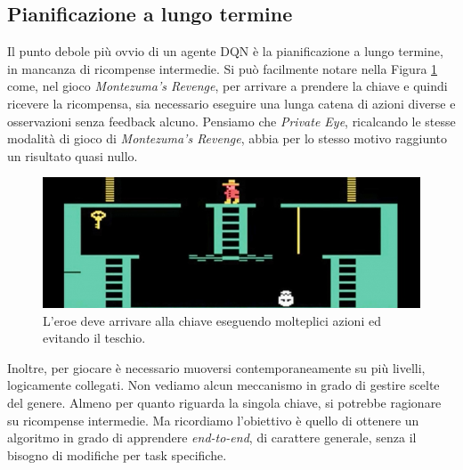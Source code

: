 \documentclass[twoside,twocolumn,10pt]{extarticle}
\theoremstyle{definition}
\begin{document}
	\subsection{Pianificazione a lungo termine}
		Il punto debole più ovvio di un agente DQN è la pianificazione a lungo termine, in mancanza di ricompense intermedie. Si può facilmente notare nella Figura \ref{fig:montezuma} come, nel gioco \textit{Montezuma's Revenge}, per arrivare a prendere la chiave e quindi ricevere la ricompensa, sia necessario eseguire una lunga catena di azioni diverse e osservazioni senza feedback alcuno. Pensiamo che \textit{Private Eye}, ricalcando le stesse modalità di gioco di \textit{Montezuma's Revenge}, abbia per lo stesso motivo raggiunto un risultato quasi nullo.
		\begin{figure}[ht!]
			\centering
			\includegraphics[scale=.31]{images/montezuma.jpg}
			\caption{L'eroe deve arrivare alla chiave eseguendo molteplici azioni ed evitando il teschio.}
			\label{fig:montezuma}
		\end{figure}
		Inoltre, per giocare è necessario muoversi contemporaneamente su più livelli, logicamente collegati. Non vediamo alcun meccanismo in grado di gestire scelte del genere. Almeno per quanto riguarda la singola chiave, si potrebbe ragionare su ricompense intermedie. Ma ricordiamo l'obiettivo è quello di ottenere un algoritmo in grado di apprendere \textit{end-to-end}, di carattere generale, senza il bisogno di modifiche per task specifiche.
		
		
\end{document}

